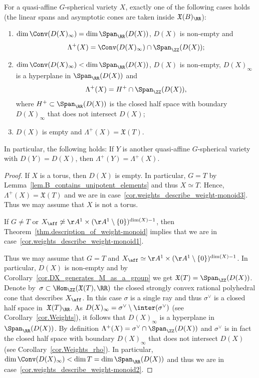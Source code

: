 \begin{corollary}
\label{cor.weights_describe_weight-monoid}
For a quasi-affine $G$-spherical variety $X$, exactly one of the following cases holds
(the linear spans and asymptotic cones are taken inside $\mathfrak{X}(B)_{\RR}$):
\begin{enumerate}
\item \label{cor.weights_describe_weight-monoid1}
$\dim \Conv(D(X)_{\infty}) = \dim \Span_{\RR}(D(X))$, $D(X)$ is non-empty and
\[
\Lambda^+(X) = \Conv ( D(X)_{\infty}) \cap \Span_{\ZZ}(D(X));
\]
\item \label{cor.weights_describe_weight-monoid2}
$\dim \Conv(D(X)_{\infty}) < \dim \Span_{\RR}(D(X))$, $D(X)$ is non-empty,
$D(X)_{\infty}$ is a hyperplane in $\Span_{\RR}(D(X))$ and
\[
\Lambda^+(X) = H^+ \cap \Span_{\ZZ}(D(X)),
\]
where $H^+ \subset \Span_{\RR}(D(X))$
is the closed half space with boundary $D(X)_{\infty}$
that does not intersect $D(X)$;
\item \label{cor.weights_describe_weight-monoid3}
$D(X)$ is empty and $\Lambda^+(X) = \mathfrak{X}(T)$.
\end{enumerate}
In particular, the following holds:
If $Y$ is another quasi-affine $G$-spherical variety with $D(Y) = D(X)$, then
$\Lambda^+(Y) = \Lambda^+(X)$.
\end{corollary}

\begin{proof}
If $X$ is a torus, then $D(X)$ is empty. In particular, $G = T$ by Lemma~\ref{lem.B_contains_unipotent_elements} and thus $X \simeq T$. Hence, $\Lambda^+(X) = \mathfrak{X}(T)$ and we are
in case~\eqref{cor.weights_describe_weight-monoid3}. Thus we may assume that $X$ is not a torus.

If $G \neq T$ or $X_{\aff} \not\simeq \AA^1 \times (\AA^1 \setminus \{0\})^{\dim(X)-1}$, then
Theorem~\ref{thm.description_of_weight-monoid} implies that we
are in case~\eqref{cor.weights_describe_weight-monoid1}.

Thus we may assume that $G = T$ and
$X_{\aff} \simeq \AA^1 \times (\AA^1 \setminus \{0\})^{\dim(X)-1}$. In particular, $D(X)$ is non-empty
and by Corollary~\ref{cor.DX_generates_M_as_a_group} we get $\mathfrak{X}(T) = \Span_{\ZZ}(D(X))$.
Denote by~$\sigma \subset \Hom_{\ZZ}(\mathfrak{X}(T), \RR)$ the closed strongly
convex rational polyhedral cone that describes $X_{\aff}$.
In this case $\sigma$ is a single ray and thus
$\sigma^\vee$ is a closed half space in~$\mathfrak{X}(T)_\RR$.
As $D(X)_\infty = \sigma^\vee \setminus \inter(\sigma^\vee)$ (see Corollary~\ref{cor.Weights}),
it follows that $D(X)_\infty$ is a hyperplane in $\Span_{\RR}(D(X))$.
By definition $\Lambda^+(X) = \sigma^\vee \cap \Span_{\ZZ}(D(X))$ and
$\sigma^\vee$ is in fact the closed half space with boundary
$D(X)_\infty$ that does not intersect $D(X)$ (see Corollary~\ref{cor.Weights_rho}).
In particular, $\dim \Conv(D(X)_\infty) < \dim T = \dim \Span_{\RR}(D(X))$
and thus we are in case~\eqref{cor.weights_describe_weight-monoid2}.
\end{proof}

